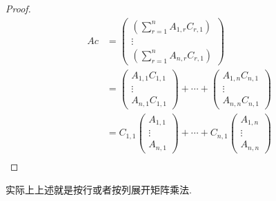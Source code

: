 \documentclass{article}
\begin{document}
\begin{proof}
$$
\begin{aligned}
Ac &=  
\begin{pmatrix}
\left(\sum\limits_{r=1}^{n}A_{1,r}C_{r,1}\right)  \\
\vdots \\
\left(\sum\limits_{r=1}^{n}A_{n,r}C_{r,1}\right)  
\end{pmatrix} \\
&= 
\begin{pmatrix}
A_{1,1}C_{1,1} \\
\vdots \\
A_{n,1}C_{1,1} 
\end{pmatrix} + \cdots +
\begin{pmatrix}
A_{1,n}C_{n,1} \\
\vdots \\
A_{n,n}C_{n,1} 
\end{pmatrix}\\ 
&= 
C_{1,1}\begin{pmatrix}
A_{1,1} \\
\vdots \\
A_{n,1} 
\end{pmatrix} + \cdots +
C_{n,1}\begin{pmatrix}
A_{1,n} \\
\vdots \\
A_{n,n} 
\end{pmatrix}\\
\end{aligned}
$$
\end{proof}

{\color{blue} 实际上上述就是按行或者按列展开矩阵乘法}.
\end{document}
